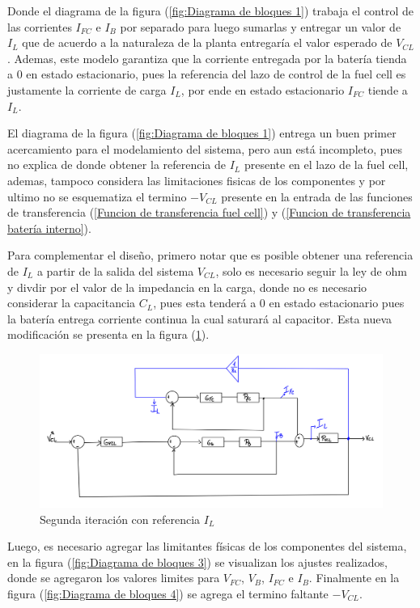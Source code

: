 Donde el diagrama de la figura (\ref{fig:Diagrama de bloques 1}) trabaja el control de las corrientes $I_{FC}$ e $I_B$ por separado para luego sumarlas y entregar un valor de $I_L$ que de acuerdo a la naturaleza de la planta entregaría el valor esperado de $V_{CL}$. Ademas, este modelo garantiza que la corriente entregada por la batería tienda a 0 en estado estacionario, pues la referencia del lazo de control de la fuel cell es justamente la corriente de carga $I_L$, por ende en estado estacionario $I_{FC}$ tiende a $I_L$. 

El diagrama de la figura (\ref{fig:Diagrama de bloques 1}) entrega un buen primer acercamiento para el modelamiento del sistema, pero aun está incompleto, pues no explica de donde obtener la referencia de $I_L$ presente en el lazo de la fuel cell, ademas, tampoco considera las limitaciones fisicas de los componentes y por ultimo no se esquematiza el termino $-V_{CL}$ presente en la entrada de las funciones de transferencia (\ref{Funcion de transferencia fuel cell}) y (\ref{Funcion de transferencia batería interno}).

Para complementar el diseño, primero notar que es posible obtener una referencia de $I_L$ a partir de la salida del sistema $V_{CL}$, solo es necesario seguir la ley de ohm y divdir por el valor de la impedancia en la carga, donde no es necesario considerar la capacitancia $C_L$, pues esta tenderá a 0 en estado estacionario pues la batería entrega corriente continua la cual saturará al capacitor. Esta nueva modificación se presenta en la figura (\ref{fig:Diagrama de bloques 2}).

\begin{figure}[htbp]
    \centering
    \includegraphics[width=\linewidth]{img/Diagrama de bloques 2.png}
    \caption{Segunda iteración con referencia $I_L$}
    \label{fig:Diagrama de bloques 2}
\end{figure}

Luego, es necesario agregar las limitantes físicas de los componentes del sistema, en la figura (\ref{fig:Diagrama de bloques 3}) se visualizan los ajustes realizados, donde se agregaron los valores limites para $V_{FC}$, $V_{B}$, $I_{FC}$ e $I_{B}$. Finalmente en la figura (\ref{fig:Diagrama de bloques 4}) se agrega el termino faltante $-V_{CL}$.
\newpage

